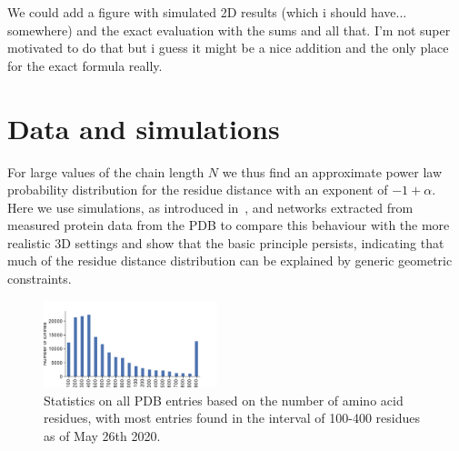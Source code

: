 \documentclass[
reprint,
twocolumn,
amsmath,amssymb,superscriptaddress,aps,
pre]{revtex4-1}
\newcommand{\red}[1]{\textcolor{red!80!black}{#1}}
\newcommand{\blue}[1]{\textcolor{blue!80!black}{#1}}
\begin{document}


\red{We could add a figure with simulated 2D results (which i should have... somewhere) and the exact evaluation with the sums and all that. I'm not super motivated to do that but i guess it might be a nice addition and the only place for the exact formula really.}

\section*{Data and simulations}
For large values of the chain length $N$ we thus find an approximate power law probability distribution for the residue distance with an exponent of $-1+\alpha$. Here we use simulations, as introduced in~\cite{molkenthin2020self}, and networks extracted from measured protein data from the PDB \cite{PDB} to compare this behaviour with the more realistic 3D settings and show that the basic principle persists, indicating that much of the residue distance distribution can be explained by generic geometric constraints.
 \begin{figure}[h]
        \centering
	\includegraphics[width=0.45\textwidth]{paper/figures/Fig2/pdb_statistics.pdf}
        \caption{Statistics on all PDB entries based on the number of amino acid residues, with most entries found in the interval of 100-400 residues as of May 26th 2020.}
        \label{fig:pdb_stats}
\end{figure}
\end{document}
